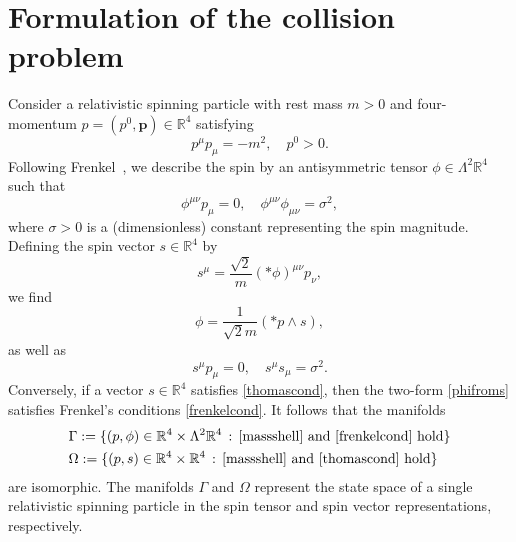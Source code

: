 \documentclass[12pt]{article}
\theoremstyle{plain}
\theoremstyle{definition}
\newcommand{\R}{\mathbb{R}}
\begin{document}
\section{Formulation of the collision problem}\label{formulation}
Consider a relativistic spinning particle with rest mass $m>0$ and four-momentum $p=(p^0,{\bm p})\in\R^4$ satisfying
\begin{equation}\label{massshell}
p^\mu p_\mu =-m^2,\quad p^0>0.
\end{equation}
Following Frenkel~\cite{Frenkel}, we describe the spin by an antisymmetric tensor $\phi\in \Lambda^2\R^4$ such that 
\begin{equation}\label{frenkelcond}
\phi^{\mu\nu}p_\mu=0,\quad
\phi^{\mu\nu}\phi_{\mu\nu}=\sigma^2,
\end{equation}
where $\sigma>0$ is a (dimensionless) constant representing the spin magnitude. Defining the spin vector $s\in\R^4$ by
\begin{equation}\label{sfromphi}
s^\mu=\frac{\sqrt{2}}{m}(*\phi)^{\mu\nu}p_\nu,
\end{equation}
we find 
\begin{equation}\label{phifroms}
\phi = \frac{1}{\sqrt{2}m}(*p\wedge s),
\end{equation} 
as well as
\begin{equation}\label{thomascond}
s^\mu p_\mu =0,\quad s^\mu s_\mu =\sigma^2.
\end{equation}
Conversely, if a vector $s\in\R^4$ satisfies \eqref{thomascond}, then the two-form \eqref{phifroms} satisfies Frenkel's conditions \eqref{frenkelcond}.
It follows that the manifolds
\begin{align*}
&\Gamma:=\{(p,\phi)\in\R^4\times\Lambda^2\R^4\,:\,\text{\eqref{massshell} and \eqref{frenkelcond} hold}\}\\
&\Omega:=\{(p,s)\in\R^4\times\R^4\,:\,\text{\eqref{massshell} and \eqref{thomascond} hold}\}
\end{align*}
are isomorphic. The manifolds $\Gamma$ and $\Omega$ represent the state space of a single relativistic spinning particle in the spin tensor and spin vector representations, respectively.
 
\end{document}

